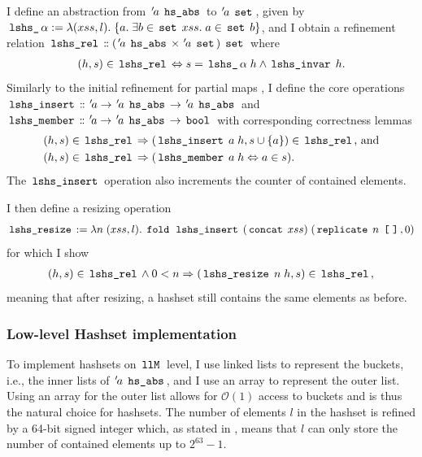 I define an abstraction from ${\mskip2mu '\mskip-2mua} \; \,\text{\ttfamily hs\_abs}\,$ to ${\mskip2mu '\mskip-2mua} \; \,\text{\ttfamily set}\,$, given by $\,\text{\ttfamily lshs\_}\,\alpha := \lambda(xss,l). \; \{a. \; \exists b\in\,\text{\ttfamily set}\, \; xss. \; a \in \,\text{\ttfamily set}\, \; b\}$, and I obtain a refinement relation $\,\text{\ttfamily lshs\_rel}\, \mathrel{\mathord{:}\mkern-1.2mu\mathord{:}} ({\mskip2mu '\mskip-2mua} \; \,\text{\ttfamily hs\_abs}\, \times {\mskip2mu '\mskip-2mua} \; \,\text{\ttfamily set}\,) \; \,\text{\ttfamily set}\,$ where
\begin{gather*}
	(h,s) \in \,\text{\ttfamily lshs\_rel}\, \Leftrightarrow s = \,\text{\ttfamily lshs\_}\,\alpha \; h \land \,\text{\ttfamily lshs\_invar}\, \; h.
\end{gather*}
Similarly to the initial refinement for partial maps , I define the core operations $\,\text{\ttfamily lshs\_insert}\, \mathrel{\mathord{:}\mkern-1.2mu\mathord{:}} {\mskip2mu '\mskip-2mua} \rightarrow {\mskip2mu '\mskip-2mua} \; \,\text{\ttfamily hs\_abs}\, \rightarrow {\mskip2mu '\mskip-2mua} \; \,\text{\ttfamily hs\_abs}\,$ and $\,\text{\ttfamily lshs\_member}\, \mathrel{\mathord{:}\mkern-1.2mu\mathord{:}} {\mskip2mu '\mskip-2mua} \rightarrow {\mskip2mu '\mskip-2mua} \; \,\text{\ttfamily hs\_abs}\, \rightarrow \,\text{\ttfamily bool}\,$ with corresponding correctness lemmas
\begin{align*}
	(h,s) \in \,\text{\ttfamily lshs\_rel}\, & \Rightarrow (\,\text{\ttfamily lshs\_insert}\, \; a \; h, s \cup \{a\}) \in \,\text{\ttfamily lshs\_rel}\, \text{, and} \\
	(h,s) \in \,\text{\ttfamily lshs\_rel}\, & \Rightarrow (\,\text{\ttfamily lshs\_member}\, \; a \; h \Leftrightarrow a \in s)\text{.}
\end{align*}
The $\,\text{\ttfamily lshs\_insert}\,$ operation also increments the counter of contained elements.

I then define a resizing operation
\begin{gather*}
	\,\text{\ttfamily lshs\_resize}\, := \lambda n \; (xss, l). \; \,\text{\ttfamily fold}\, \; \,\text{\ttfamily lshs\_insert}\, \; (\,\text{\ttfamily concat}\, \; xss) \; (\,\text{\ttfamily replicate}\, \; n \; \,\text{\ttfamily [\;]}\,,0)
\end{gather*}
for which I show
\begin{gather*}
	(h,s) \in \,\text{\ttfamily lshs\_rel}\, \land 0 < n \Rightarrow (\,\text{\ttfamily lshs\_resize}\, \; n \; h, s) \in \,\text{\ttfamily lshs\_rel}\,,
\end{gather*}
meaning that after resizing, a hashset still contains the same elements as before.

\subsubsection{Low-level Hashset implementation}\label{sec:low-level-hashset-implementation}
To implement hashsets on $\,\text{\ttfamily llM}\,$ level, I use linked lists to represent the buckets, i.e., the inner lists of ${\mskip2mu '\mskip-2mua} \; \,\text{\ttfamily hs\_abs}\,$, and I use an array to represent the outer list.
Using an array for the outer list allows for $\mathcal{O}(1)$ access to buckets and is thus the natural choice for hashsets.
The number of elements $l$ in the hashset is refined by a 64-bit signed integer which, as stated in , means that $l$ can only store the number of contained elements up to $2^{63}-1$.

